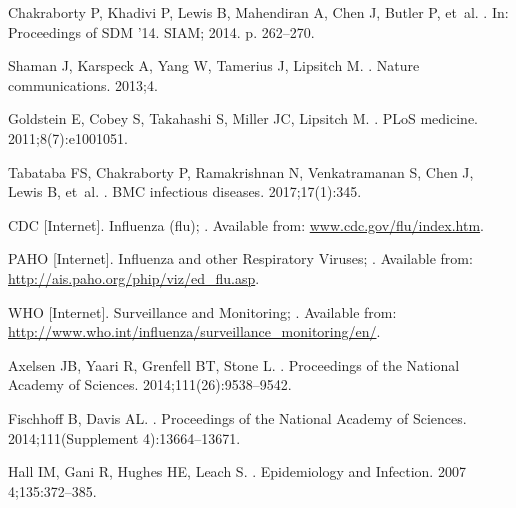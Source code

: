 \documentclass[10pt,letterpaper]{article}
\begin{document}
\begin{thebibliography}{10}

Chakraborty P, Khadivi P, Lewis B, Mahendiran A, Chen J, Butler P, et~al.
.
\newblock In: Proceedings of SDM '14. SIAM; 2014. p. 262--270.

Shaman J, Karspeck A, Yang W, Tamerius J, Lipsitch M.
.
\newblock Nature communications. 2013;4.

Goldstein E, Cobey S, Takahashi S, Miller JC, Lipsitch M.
.
\newblock PLoS medicine. 2011;8(7):e1001051.

Tabataba FS, Chakraborty P, Ramakrishnan N, Venkatramanan S, Chen J, Lewis B,
  et~al.
.
\newblock BMC infectious diseases. 2017;17(1):345.

{CDC [Internet]}. {Influenza (flu)};
.
\newblock Available from: \url{www.cdc.gov/flu/index.htm}.

{PAHO [Internet]}. {Influenza and other Respiratory Viruses};
.
\newblock Available from: \url{http://ais.paho.org/phip/viz/ed_flu.asp}.

{WHO [Internet]}. {Surveillance and Monitoring};
.
\newblock Available from:
  \url{http://www.who.int/influenza/surveillance_monitoring/en/}.

Axelsen JB, Yaari R, Grenfell BT, Stone L.
.
\newblock Proceedings of the National Academy of Sciences.
  2014;111(26):9538--9542.

Fischhoff B, Davis AL.
.
\newblock Proceedings of the National Academy of Sciences. 2014;111(Supplement
  4):13664--13671.

Hall IM, Gani R, Hughes HE, Leach S.
.
\newblock Epidemiology and Infection. 2007 4;135:372--385.


\end{thebibliography}
\end{document}
